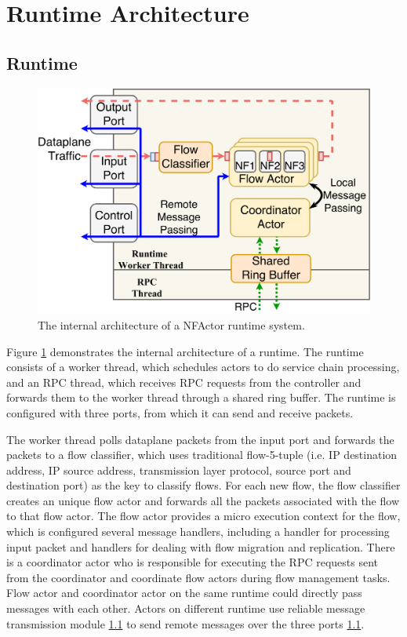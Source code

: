 \section{Runtime Architecture}

\subsection{Runtime}

\begin{figure}
		\centering
		\includegraphics[width=\columnwidth]{figure/new-nfactor-runtime-arch.pdf}

		\caption{The internal architecture of a NFActor runtime system. }
\label{fig:runtime-arch}
\end{figure}

Figure \ref{fig:runtime-arch} demonstrates the internal architecture of a runtime. The runtime consists of a worker thread, which schedules actors to do service chain processing, and an RPC thread, which receives RPC requests from the controller and forwards them to the worker thread through a shared ring buffer. The runtime is configured with three ports, from which it can send and receive packets.

The worker thread polls dataplane packets from the input port and forwards the packets to a flow classifier, which uses traditional flow-5-tuple (i.e. IP destination address, IP source address, transmission layer protocol, source port and destination port) as the key to classify flows. For each new flow, the flow classifier creates an unique flow actor and forwards all the packets associated with the flow to that flow actor. The flow actor provides a micro execution context for the flow, which is configured several message handlers, including a handler for processing input packet and handlers for dealing with flow migration and replication. There is a coordinator actor who is responsible for executing the RPC requests sent from the coordinator and coordinate flow actors during flow management tasks. Flow actor and coordinator actor on the same runtime could directly pass messages with each other. Actors on different runtime use reliable message transmission module \ref{} to send remote messages over the three ports \ref{}.

